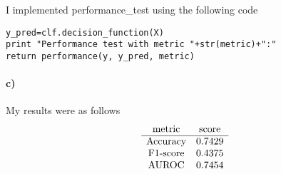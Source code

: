 \documentclass[12pt]{article}
\begin{document}
I implemented performance\_test using the following code
\begin{verbatim}
y_pred=clf.decision_function(X)
print "Performance test with metric "+str(metric)+":"
return performance(y, y_pred, metric)
\end{verbatim}

\paragraph{c)}

My results were as follows
\[
        \begin{array}{c c}
                \text{metric} & \text{score}\\
                \hline
                \text{Accuracy} & 0.7429\\
                \text{F1-score} & 0.4375\\
                \text{AUROC} & 0.7454
        \end{array}
\]
\end{document}

